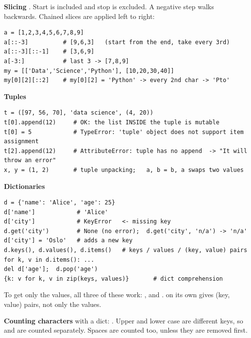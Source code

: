 \textbf{Slicing} . Start is included and stop is excluded. A negative step walks backwards. Chained slices are applied left to right:
\begin{codebox}
\begin{Verbatim}
a = [1,2,3,4,5,6,7,8,9]
a[::-3]          # [9,6,3]   (start from the end, take every 3rd)
a[::-3][::-1]    # [3,6,9]
a[-3:]           # last 3 -> [7,8,9]
my = [['Data','Science','Python'], [10,20,30,40]]
my[0][2][::2]    # my[0][2] = 'Python' -> every 2nd char -> 'Pto'
\end{Verbatim}
\end{codebox}

\textbf{Tuples}
\begin{codebox}
\begin{Verbatim}
t = ([97, 56, 70], 'data science', (4, 20))
t[0].append(12)     # OK: the list INSIDE the tuple is mutable
t[0] = 5            # TypeError: 'tuple' object does not support item assignment
t[2].append(12)     # AttributeError: tuple has no append  -> "It will throw an error"
x, y = (1, 2)       # tuple unpacking;   a, b = b, a swaps two values
\end{Verbatim}
\end{codebox}

\textbf{Dictionaries}
\begin{codebox}
\begin{Verbatim}
d = {'name': 'Alice', 'age': 25}
d['name']            # 'Alice'
d['city']            # KeyError   <- missing key
d.get('city')        # None (no error);  d.get('city', 'n/a') -> 'n/a'
d['city'] = 'Oslo'   # adds a new key
d.keys(), d.values(), d.items()   # keys / values / (key, value) pairs
for k, v in d.items(): ...
del d['age'];  d.pop('age')
{k: v for k, v in zip(keys, values)}       # dict comprehension
\end{Verbatim}
\end{codebox}
To get only the values, all three of these work: ,  and .
 on its own gives (key, value) pairs, not only the values.

\textbf{Counting characters} with a dict: . Upper and lower case are different keys, so  and  are counted separately. Spaces are counted too, unless they are removed first.


